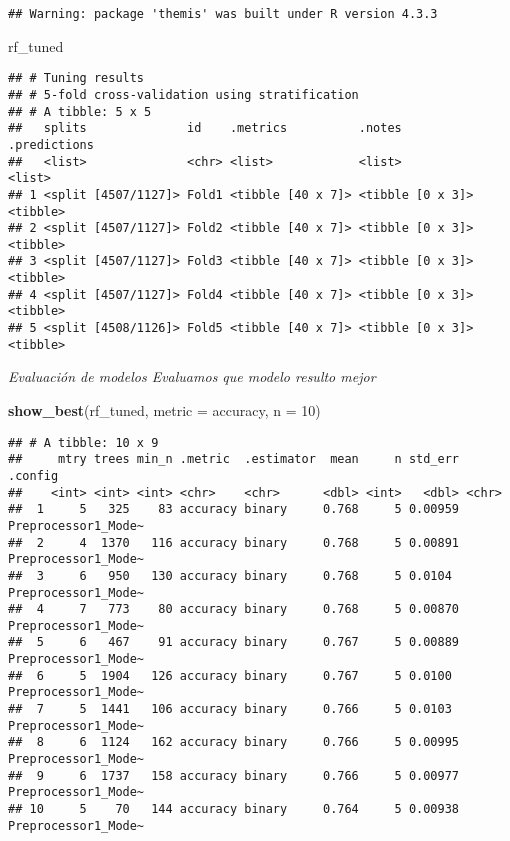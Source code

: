 \documentclass[
]{article}
\newenvironment{Shaded}{\begin{snugshade}}{\end{snugshade}}
\newcommand{\AttributeTok}[1]{\textcolor[rgb]{0.13,0.29,0.53}{#1}}
\newcommand{\DecValTok}[1]{\textcolor[rgb]{0.00,0.00,0.81}{#1}}
\newcommand{\FunctionTok}[1]{\textcolor[rgb]{0.13,0.29,0.53}{\textbf{#1}}}
\newcommand{\NormalTok}[1]{#1}
\newcommand{\StringTok}[1]{\textcolor[rgb]{0.31,0.60,0.02}{#1}}
\begin{document}
\begin{verbatim}
## Warning: package 'themis' was built under R version 4.3.3
\end{verbatim}

\begin{Shaded}
\begin{Highlighting}[]
\NormalTok{rf\_tuned}
\end{Highlighting}
\end{Shaded}

\begin{verbatim}
## # Tuning results
## # 5-fold cross-validation using stratification 
## # A tibble: 5 x 5
##   splits              id    .metrics          .notes           .predictions
##   <list>              <chr> <list>            <list>           <list>      
## 1 <split [4507/1127]> Fold1 <tibble [40 x 7]> <tibble [0 x 3]> <tibble>    
## 2 <split [4507/1127]> Fold2 <tibble [40 x 7]> <tibble [0 x 3]> <tibble>    
## 3 <split [4507/1127]> Fold3 <tibble [40 x 7]> <tibble [0 x 3]> <tibble>    
## 4 <split [4507/1127]> Fold4 <tibble [40 x 7]> <tibble [0 x 3]> <tibble>    
## 5 <split [4508/1126]> Fold5 <tibble [40 x 7]> <tibble [0 x 3]> <tibble>
\end{verbatim}

\emph{Evaluación de modelos Evaluamos que modelo resulto mejor}

\begin{Shaded}
\begin{Highlighting}[]
\FunctionTok{show\_best}\NormalTok{(rf\_tuned, }\AttributeTok{metric =} \StringTok{\textquotesingle{}accuracy\textquotesingle{}}\NormalTok{, }\AttributeTok{n =} \DecValTok{10}\NormalTok{)}
\end{Highlighting}
\end{Shaded}

\begin{verbatim}
## # A tibble: 10 x 9
##     mtry trees min_n .metric  .estimator  mean     n std_err .config            
##    <int> <int> <int> <chr>    <chr>      <dbl> <int>   <dbl> <chr>              
##  1     5   325    83 accuracy binary     0.768     5 0.00959 Preprocessor1_Mode~
##  2     4  1370   116 accuracy binary     0.768     5 0.00891 Preprocessor1_Mode~
##  3     6   950   130 accuracy binary     0.768     5 0.0104  Preprocessor1_Mode~
##  4     7   773    80 accuracy binary     0.768     5 0.00870 Preprocessor1_Mode~
##  5     6   467    91 accuracy binary     0.767     5 0.00889 Preprocessor1_Mode~
##  6     5  1904   126 accuracy binary     0.767     5 0.0100  Preprocessor1_Mode~
##  7     5  1441   106 accuracy binary     0.766     5 0.0103  Preprocessor1_Mode~
##  8     6  1124   162 accuracy binary     0.766     5 0.00995 Preprocessor1_Mode~
##  9     6  1737   158 accuracy binary     0.766     5 0.00977 Preprocessor1_Mode~
## 10     5    70   144 accuracy binary     0.764     5 0.00938 Preprocessor1_Mode~
\end{verbatim}
\end{document}
